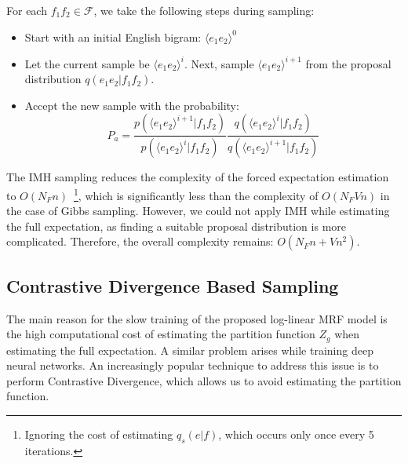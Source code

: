 For each $f_1 f_2  \in \mathcal{F}$, we take the following steps during sampling:
\begin{itemize}
\item Start with an initial English bigram: $\langle e_1 e_2\rangle^{0}$
\item Let the current sample be $\langle e_1 e_2 \rangle^{i}$. Next, sample ${\langle e_1 e_2 \rangle}^{i+1}$ from the proposal distribution $q(e_1 e_2|f_1 f_2)$.
\item Accept the new sample with the probability:
\begin{equation*}
P_a = \frac{p( \langle e_1 e_2 \rangle^{i+1}|f_1f_2)} {p(\langle e_1 e_2 \rangle^{i}|f_1f_2) } \frac{q(\langle e_1e_2 \rangle^{i}|f_1f_2)}{q(\langle e_1e_2 \rangle^{i+1}|f_1f_2)}
\end{equation*}
\end {itemize}
The IMH sampling reduces the complexity of the forced expectation estimation to $O(N_F n)$~\footnote{Ignoring the cost of estimating $q_s(e|f)$, which occurs only once every 5 iterations.}, which is significantly less than the complexity of $O(N_F V n )$ in the case of Gibbs sampling.
However, we could not apply IMH while estimating the full expectation, as finding a suitable proposal distribution is more complicated. Therefore, the overall complexity remains: $O(N_F n + Vn^2)$.

\subsection{Contrastive Divergence Based Sampling}
The main reason for the slow training of the proposed log-linear MRF model is the high computational cost of estimating the partition function $Z_g$ when estimating the full expectation. 
A similar problem arises while training deep neural networks. 
An increasingly popular technique to address this issue is to perform Contrastive Divergence, which allows us to avoid estimating the partition function.

